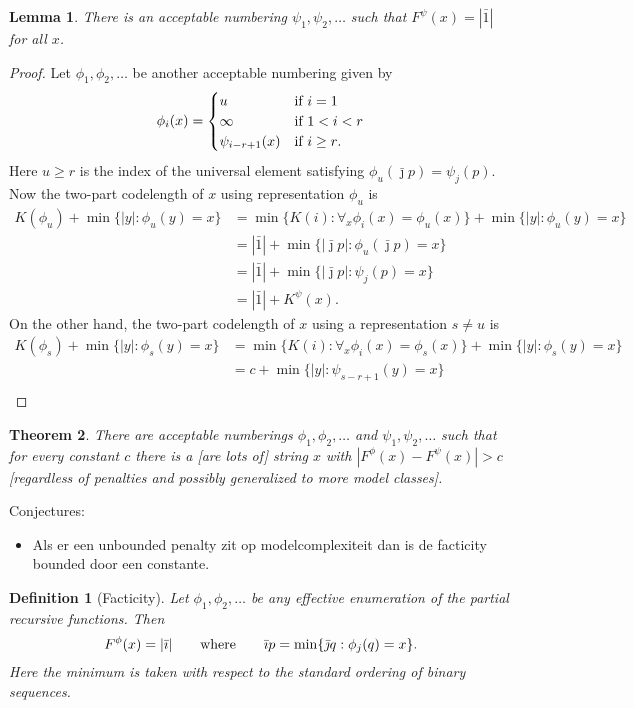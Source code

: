 \documentclass{article}
\newtheorem{theorem}{Theorem}
\newtheorem{lemma}[theorem]{Lemma}
\newtheorem{definition}{Definition}
\newcommand{\tn}[1]{\textnormal{#1}}
\begin{document}
\begin{lemma}
There is an acceptable numbering $\psi_1,\psi_2,\ldots$ such that $F^\psi(x)=|\bar 1|$ for all $x$.
\end{lemma}
\begin{proof}
Let $\phi_1,\phi_2,\ldots$ be another acceptable numbering given by
\[
\phi_i(x)=\begin{cases}
u&\tn{if $i=1$}\\
\infty&\tn{if $1<i<r$}\\
\psi_{i-r+1}(x)&\tn{if $i\ge r$}.
\end{cases}\]
Here $u\ge r$ is the index of the universal element satisfying $\phi_u(\bar\jmath p)=\psi_j(p)$.
Now the two-part codelength of $x$ using representation $\phi_u$ is
\[\begin{split}
K(\phi_u)+\min\{|y|:\phi_u(y)=x\}&=\min\{K(i):\forall_x\phi_i(x)=\phi_u(x)\}+\min\{|y|:\phi_u(y)=x\}\\
&=|\bar 1|+\min\{|\bar\jmath p|:\phi_u(\bar\jmath p)=x\}\\
&=|\bar 1|+\min\{|\bar\jmath p|:\psi_j(p)=x\}\\
&=|\bar 1|+K^\psi(x).
\end{split}\]
On the other hand, the two-part codelength of $x$ using a representation $s\ne u$ is
\[\begin{split}
K(\phi_s)+\min\{|y|:\phi_s(y)=x\}&=\min\{K(i):\forall_x\phi_i(x)=\phi_s(x)\}+\min\{|y|:\phi_s(y)=x\}\\
&=c+\min\{|y|:\psi_{s-r+1}(y)=x\}\\
\end{split}\]




\end{proof}


\begin{theorem}
  There are acceptable numberings $\phi_1,\phi_2,\ldots$ and $\psi_1,\psi_2,\ldots$ such that for every constant $c$ there is a [are lots of] string $x$ with $|F^\phi(x)-F^\psi(x)|>c$ [regardless of penalties and possibly generalized to more model classes].
\end{theorem}

Conjectures:
\begin{itemize}
\item Als er een unbounded penalty zit op modelcomplexiteit dan is de facticity bounded door een constante.
\end{itemize}

\begin{definition}[Facticity]
  Let $\phi_1,\phi_2,\ldots$ be any effective enumeration of the partial recursive functions. Then
  \[F^\phi(x)=|\bar\imath|\qquad\tn{where}\qquad \bar\imath p=\min\{\bar\jmath q:\phi_j(q)=x\}.
  \]
  Here the minimum is taken with respect to the standard ordering of binary sequences.
\end{definition}
\end{document}
